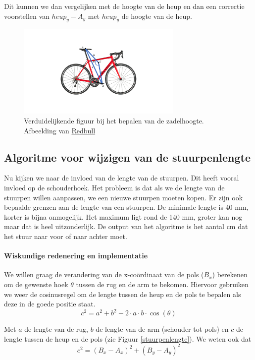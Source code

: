 \documentclass[a4paper,twoside,kulak]{kulakreport}
\begin{document}
Dit kunnen we dan vergelijken met de hoogte van de heup en dan een correctie voorstellen van \(heup_y - A_y\) met \(heup_y\) de hoogte van de heup.
\begin{figure}[H]
	\begin{center}
		\includegraphics[width=8cm]{fiets.pdf}
	\end{center}
	\caption{Verduidelijkende figuur bij het bepalen van de zadelhoogte. Afbeelding van \href{redbull.com}{Redbull}}
	\label{fiets}
\end{figure}

\subsection{Algoritme voor wijzigen van de stuurpenlengte}

Nu kijken we naar de invloed van de lengte van de stuurpen. Dit heeft vooral invloed op de schouderhoek. Het probleem is dat als we de lengte van de stuurpen willen aanpassen, we een nieuwe stuurpen moeten kopen. Er zijn ook bepaalde grenzen aan de lengte van een stuurpen. De minimale lengte is 40 \si{mm}, korter is bijna onmogelijk. Het maximum ligt rond de 140 \si{mm}, groter kan nog maar dat is heel uitzonderlijk. De output van het algoritme is het aantal \si{cm} dat het stuur naar voor of naar achter moet.


\paragraph{Wiskundige redenering en implementatie}


We willen graag de verandering van de x-coördinaat van de pols (\(B_x\)) berekenen om de gewenste hoek $\theta$ tussen de rug en de arm te bekomen. Hiervoor gebruiken we weer de cosinusregel om de lengte tussen de heup en de pols te bepalen als deze in de goede positie staat.
\[c^2 = a^2 + b^2 -2\cdot a\cdot b\cdot \cos(\theta)\]

Met \(a\) de lengte van de rug, \(b\) de lengte van de arm (schouder tot pols) en \(c\) de lengte tussen de heup en de pols (zie Figuur \ref{stuurpenlengte}). We weten ook dat
\[c^2 = (B_x - A_x)^2 + (B_y - A_y)^2\]
\end{document}
